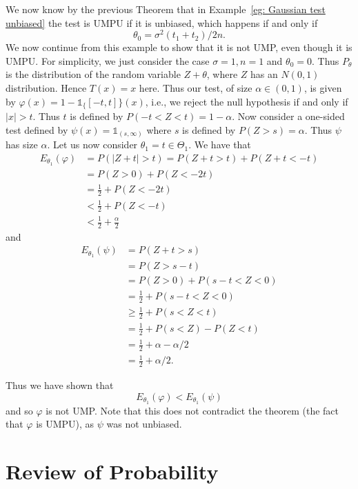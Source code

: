 \documentclass[twoside, a4paper, 10pt]{amsart}
\begin{document}
\begin{eg} We now know by the previous Theorem that in Example~\ref{eg: Gaussian test unbiased} the test is UMPU if it is unbiased, which happens if and only if $$\theta_0 = \sigma^2(t_1+t_2)/2n.$$ We now continue from this example to show that it is not UMP, even though it is UMPU. For simplicity, we just consider the case $\sigma = 1, n = 1$ and $\theta_0 = 0$. Thus $P_{\theta}$ is the distribution of the random variable $Z+\theta$, where $Z$ has an $N(0,1)$ distribution. Hence $T(x) = x$ here. Thus our test, of size $\alpha \in (0,1)$, is given by $\varphi(x) = 1 - \mathds{1}_\{[-t,t]\}(x)$, i.e., we reject the null hypothesis if and only if $|x|>t$. Thus $t$ is defined by $P(-t < Z < t) = 1 - \alpha$. Now consider a one-sided test defined by $\psi(x) = \mathds{1}_{(s, \infty)}$ where $s$ is defined by $P(Z > s) = \alpha$. Thus $\psi$ has size $\alpha$. Let us now consider $\theta_1 = t \in \Theta_1$. We have that 
\begin{align*} 
E_{\theta_1}(\varphi) &= P(|Z+t| > t) = P(Z+t>t) + P(Z+t < -t)  \\
&= P(Z>0) + P(Z < -2t) \\
&= \frac{1}{2} + P(Z< - 2t) \\
&< \frac{1}{2} + P(Z< -t) \\
&< \frac{1}{2} + \frac{\alpha}{2}
\end{align*}
and
\begin{align*}
E_{\theta_1}(\psi) &= P(Z+t>s) \\
&= P(Z>s-t) \\
&= P(Z>0) + P(s-t<Z<0) \\
&= \frac{1}{2} + P(s-t <Z <0) \\
&\geq \frac{1}{2} + P(s<Z<t) \\
&= \frac{1}{2} + P(s<Z) - P(Z<t) \\
&= \frac{1}{2} + \alpha - \alpha/2 \\
&= \frac{1}{2}+\alpha/2.
\end{align*}

Thus we have shown that $$E_{\theta_1}(\varphi) < E_{\theta_1}(\psi)$$ and so $\varphi$ is not UMP. Note that this does not contradict the theorem (the fact that $\varphi$ is UMPU), as $\psi$ was not unbiased.

\end{eg}

\appendix

\section{Review of Probability}
\end{document}
